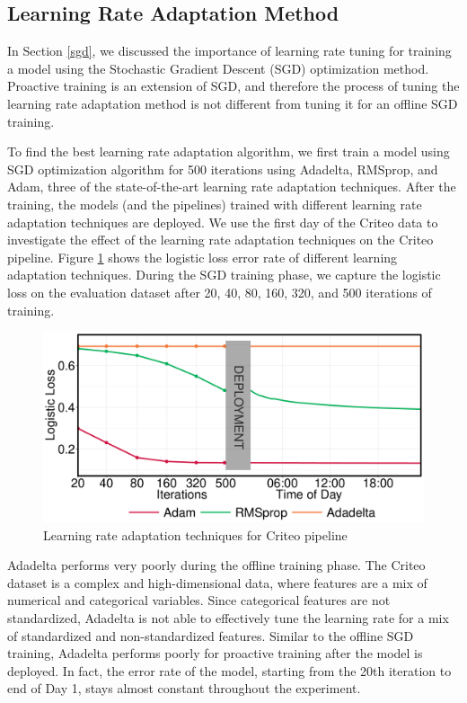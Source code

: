 \subsection{Learning Rate Adaptation Method}
In Section \ref{sgd}, we discussed the importance of learning rate tuning for training a model using the Stochastic Gradient Descent (SGD) optimization method.
Proactive training is an extension of SGD, and therefore the process of tuning the learning rate adaptation method is not different from tuning it for an offline SGD training.

To find the best learning rate adaptation algorithm, we first train a model using SGD optimization algorithm for 500 iterations using Adadelta, RMSprop, and Adam, three of the state-of-the-art learning rate adaptation techniques.
After the training, the models (and the pipelines) trained with different learning rate adaptation techniques are deployed.
We use the first day of the Criteo data to investigate the effect of the learning rate adaptation techniques on the Criteo pipeline.
Figure \ref{fig:criteo-learning-rate} shows the logistic loss error rate of different learning adaptation techniques. 
During the SGD training phase, we capture the logistic loss on the evaluation dataset after 20, 40, 80, 160, 320, and 500 iterations of training.


\begin{figure}[h!]
\includegraphics[width=\columnwidth]{../images/experiment-results/criteo-learning-rate-experiment.pdf}
\caption{Learning rate adaptation techniques for Criteo pipeline}
\label{fig:criteo-learning-rate}
\end{figure}

Adadelta performs very poorly during the offline training phase.
The Criteo dataset is a complex and high-dimensional data, where features are a mix of numerical and categorical variables.
Since categorical features are not standardized, Adadelta is not able to effectively tune the learning rate for a mix of standardized and non-standardized features.
Similar to the offline SGD training, Adadelta performs poorly for proactive training after the model is deployed.
In fact, the error rate of the model, starting from the 20th iteration to end of Day 1, stays almost constant throughout the experiment.

